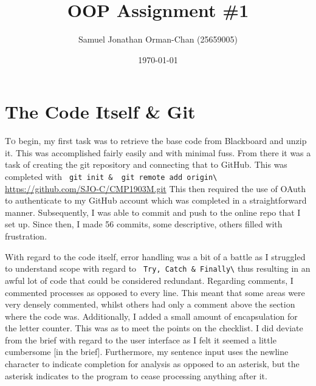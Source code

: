 \documentclass[11pt]{article} %
\title{OOP Assignment \#1}
\author{Samuel Jonathan Orman-Chan (25659005)}
\date{\today} %
\begin{document}
\maketitle
\section{The Code Itself \& Git}
\lettrine{T}{o} begin, my first task was to retrieve the base code from Blackboard and unzip it. This was accomplished fairly easily and with minimal fuss. From there it was a task of creating the git repository and connecting that to GitHub. This was completed with \Verb+ git init &  git remote add origin\+ \url{https://github.com/SJO-C/CMP1903M.git} This then required the use of OAuth to authenticate to my GitHub account which was completed in a straightforward manner. Subsequently, I was able to commit and push to the online repo that I set up. Since then, I made 56 commits, some descriptive, others filled with frustration. \par
With regard to the code itself, error handling was a bit of a battle as I struggled to understand scope with regard to \Verb+ Try, Catch & Finally\+ thus resulting in an awful lot of code that could be considered redundant. Regarding comments, I commented processes as opposed to every line. This meant that some areas were very densely commented, whilst others had only a comment above the section where the code was. Additionally, I added a small amount of encapsulation for the letter counter. This was as to meet the points on the checklist. I did deviate from the brief with regard to the user interface as I felt it seemed a little cumbersome [in the brief]. Furthermore, my sentence input  uses the newline character to indicate completion for analysis as opposed to an asterisk, but the asterisk indicates to the program to cease processing anything after it.
\end{document}
